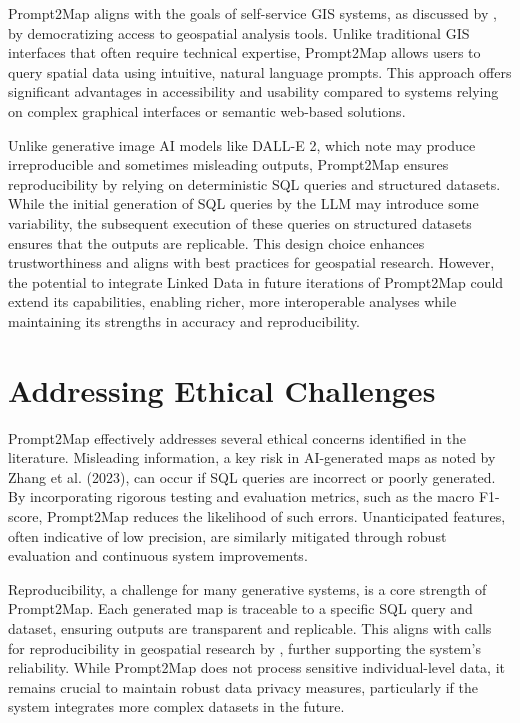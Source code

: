 Prompt2Map aligns with the goals of self-service GIS systems, as discussed by \citep{rowland_towards_2020}, by democratizing access to geospatial analysis tools. Unlike traditional GIS interfaces that often require technical expertise, Prompt2Map allows users to query spatial data using intuitive, natural language prompts. This approach offers significant advantages in accessibility and usability compared to systems relying on complex graphical interfaces or semantic web-based solutions.

Unlike generative image AI models like DALL-E 2, which \citep{zhang_ethics_2023} note may produce irreproducible and sometimes misleading outputs, Prompt2Map ensures reproducibility by relying on deterministic SQL queries and structured datasets. While the initial generation of SQL queries by the LLM may introduce some variability, the subsequent execution of these queries on structured datasets ensures that the outputs are replicable. This design choice enhances trustworthiness and aligns with best practices for geospatial research. However, the potential to integrate Linked Data in future iterations of Prompt2Map could extend its capabilities, enabling richer, more interoperable analyses while maintaining its strengths in accuracy and reproducibility.

\section{Addressing Ethical Challenges}

Prompt2Map effectively addresses several ethical concerns identified in the literature. Misleading information, a key risk in AI-generated maps as noted by Zhang et al. (2023), can occur if SQL queries are incorrect or poorly generated. By incorporating rigorous testing and evaluation metrics, such as the macro F1-score, Prompt2Map reduces the likelihood of such errors. Unanticipated features, often indicative of low precision, are similarly mitigated through robust evaluation and continuous system improvements.

Reproducibility, a challenge for many generative systems, is a core strength of Prompt2Map. Each generated map is traceable to a specific SQL query and dataset, ensuring outputs are transparent and replicable. This aligns with calls for reproducibility in geospatial research by \citep{zhang_ethics_2023}, further supporting the system's reliability. While Prompt2Map does not process sensitive individual-level data, it remains crucial to maintain robust data privacy measures, particularly if the system integrates more complex datasets in the future.

